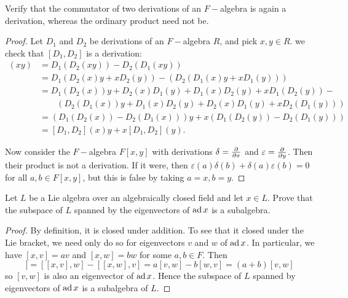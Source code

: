 \begin{ex}
  Verify that the commutator of two derivations of an $F-$algebra is again a derivation, whereas the ordinary product need not be.
\end{ex}
\begin{proof}
  Let $D_1$ and $D_2$ be derivations of an $F-$algebra $R$, and pick $x,y\in R$. we check that $[D_1,D_2]$ is a derivation:
  \begin{align*}
    [D_1,D_2](xy) &= D_1(D_2(xy)) - D_2(D_1(xy)) \\
    &= D_1(D_2(x)y + xD_2(y)) - (D_2(D_1(x)y + xD_1(y))) \\
    &= D_1(D_2(x))y + D_2(x)D_1(y) + D_1(x)D_2(y) + xD_1(D_2(y))- \\
    & \qquad (D_2(D_1(x))y + D_1(x)D_2(y) + D_2(x)D_1(y) + xD_2(D_1(y))) \\
    &= (D_1(D_2(x)) - D_2(D_1(x)))y + x(D_1(D_2(y)) - D_2(D_1(y))) \\
    &= [D_1,D_2](x)y + x[D_1,D_2](y).
  \end{align*}

  Now consider the $F-$algebra $F[x, y]$ with derivations $\delta=\frac{\partial{}}{\partial{x}}$ and $\varepsilon=\frac{\partial{}}{\partial{y}}$. Then their product is not a derivation. If it were, then $\varepsilon(a)\delta(b)+\delta(a)\varepsilon(b) = 0$ for all $a, b \in F[x, y]$, but this is false by taking $a = x, b = y$.
\end{proof}

\begin{ex}
  Let $L$ be a Lie algebra over an algebraically closed field and let $x\in L$. Prove that the subspace of $L$ spanned by the eigenvectors of $\operatorname{ad} x$ is a subalgebra.
\end{ex}
\begin{proof}
  By definition, it is closed under addition. To see that it closed under the Lie bracket, we need only do so for eigenvectors $v$ and $w$ of $\operatorname{ad} x$. In particular, we have $[x,v] = av$ and $[x,w] = bw$ for some $a, b \in F$. Then
  \begin{equation*}
    [x,[v,w]] = [[x,v],w] - [[x,w], v] = a[v,w] - b[w,v] = (a+b)[v,w]
  \end{equation*}
  so $[v,w]$ is also an eigenvector of $\operatorname{ad} x$. Hence the subspace of $L$ spanned by eigenvectors of $\operatorname{ad} x$ is a subalgebra of $L$.
\end{proof}


